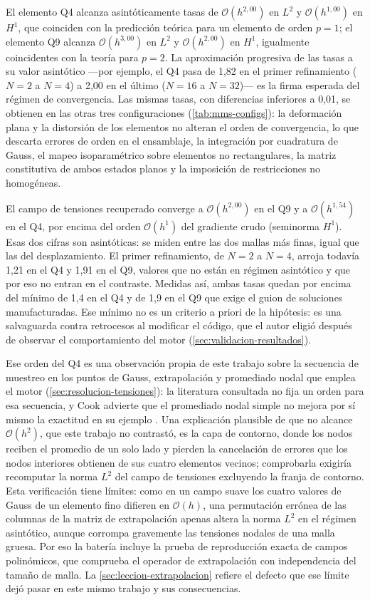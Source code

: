 El elemento Q4 alcanza asintóticamente tasas de $\mathcal{O}(h^{2{,}00})$ en $L^2$ y $\mathcal{O}(h^{1{,}00})$ en $H^1$, que coinciden con la predicción teórica para un elemento de orden $p=1$; el elemento Q9 alcanza $\mathcal{O}(h^{3{,}00})$ en $L^2$ y $\mathcal{O}(h^{2{,}00})$ en $H^1$, igualmente coincidentes con la teoría para $p=2$. La aproximación progresiva de las tasas a su valor asintótico ---por ejemplo, el Q4 pasa de 1,82 en el primer refinamiento ($N=2$ a $N=4$) a 2,00 en el último ($N=16$ a $N=32$)--- es la firma esperada del régimen de convergencia. Las mismas tasas, con diferencias inferiores a 0,01, se obtienen en las otras tres configuraciones (\autoref{tab:mms-configs}): la deformación plana y la distorsión de los elementos no alteran el orden de convergencia, lo que descarta errores de orden en el ensamblaje, la integración por cuadratura de Gauss, el mapeo isoparamétrico sobre elementos no rectangulares, la matriz constitutiva de ambos estados planos y la imposición de restricciones no homogéneas.

El campo de tensiones recuperado converge a $\mathcal{O}(h^{2{,}00})$ en el Q9 y a $\mathcal{O}(h^{1{,}54})$ en el Q4, por encima del orden $\mathcal{O}(h^{1})$ del gradiente crudo (seminorma $H^1$). Esas dos cifras son asintóticas: se miden entre las dos mallas más finas, igual que las del desplazamiento. El primer refinamiento, de $N=2$ a $N=4$, arroja todavía 1,21 en el Q4 y 1,91 en el Q9, valores que no están en régimen asintótico y que por eso no entran en el contraste. Medidas así, ambas tasas quedan por encima del mínimo de 1,4 en el Q4 y de 1,9 en el Q9 que exige el guion de soluciones manufacturadas. Ese mínimo no es un criterio a priori de la hipótesis: es una salvaguarda contra retrocesos al modificar el código, que el autor eligió después de observar el comportamiento del motor (\autoref{sec:validacion-resultados}).

Ese orden del Q4 es una observación propia de este trabajo sobre la secuencia de muestreo en los puntos de Gauss, extrapolación y promediado nodal que emplea el motor (\autoref{sec:resolucion-tensiones}): la literatura consultada no fija un orden para esa secuencia, y Cook advierte que el promediado nodal simple no mejora por sí mismo la exactitud en su ejemplo \autocite[p.~231]{cook2002concepts}. Una explicación plausible de que no alcance $\mathcal{O}(h^{2})$, que este trabajo no contrastó, es la capa de contorno, donde los nodos reciben el promedio de un solo lado y pierden la cancelación de errores que los nodos interiores obtienen de sus cuatro elementos vecinos; comprobarla exigiría recomputar la norma $L^2$ del campo de tensiones excluyendo la franja de contorno. Esta verificación tiene límites: como en un campo suave los cuatro valores de Gauss de un elemento fino difieren en $\mathcal{O}(h)$, una permutación errónea de las columnas de la matriz de extrapolación apenas altera la norma $L^2$ en el régimen asintótico, aunque corrompa gravemente las tensiones nodales de una malla gruesa. Por eso la batería incluye la prueba de reproducción exacta de campos polinómicos, que comprueba el operador de extrapolación con independencia del tamaño de malla. La \autoref{sec:leccion-extrapolacion} refiere el defecto que ese límite dejó pasar en este mismo trabajo y sus consecuencias.

